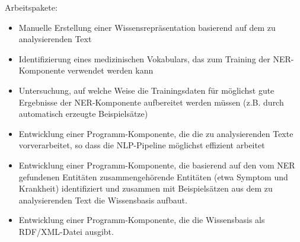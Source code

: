 Arbeitspakete:
\begin{itemize}
    \item Manuelle Erstellung einer Wissensrepräsentation basierend auf dem zu analysierenden Text
    \item Identifizierung eines medizinischen Vokabulars, das zum Training der NER-Komponente verwendet werden kann
    \item Untersuchung, auf welche Weise die Trainingsdaten für möglichst gute Ergebnisse der NER-Komponente aufbereitet werden müssen (z.B. durch automatisch erzeugte Beispielsätze)
    \item Entwicklung einer Programm-Komponente, die die zu analysierenden Texte vorverarbeitet, so dass die NLP-Pipeline möglichst effizient arbeitet
    \item Entwicklung einer Programm-Komponente, die basierend auf den vom NER gefundenen Entitäten zusammengehörende Entitäten (etwa Symptom und Krankheit) identifiziert und zusammen mit Beispielsätzen aus dem zu analysierenden Text die Wissensbasis aufbaut.
    \item Entwicklung einer Programm-Komponente, die die Wissensbasis als RDF/XML-Datei ausgibt.
\end{itemize}



